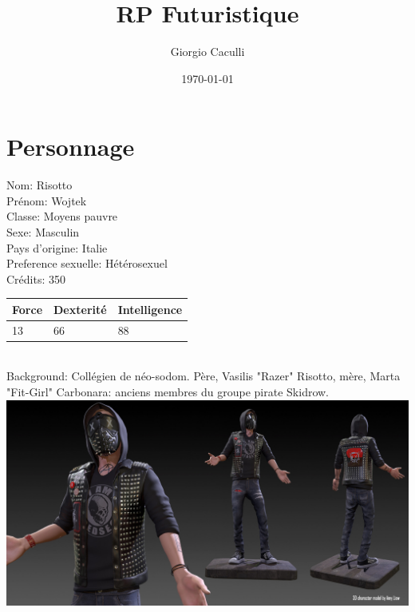 \documentclass[12pt]{article}
\title{RP Futuristique}
\author{Giorgio Caculli}
\date{\today}
\begin{document}
	\maketitle
	
	\newpage
	\tableofcontents
	
	\newpage
	\section{Personnage}
	
	Nom: Risotto\\
	
	Prénom: Wojtek\\
	
	Classe: Moyens pauvre\\
	
	Sexe: Masculin\\
	
	Pays d'origine: Italie\\
	
	Preference sexuelle: Hétérosexuel\\
	
	Crédits: 350\\
	
	\begin{tabularx}{\textwidth}{|X|X|X|}
		\hline
		Force & Dexterité & Intelligence\\
		\hline
		13 & 66 & 88\\
		\hline
	\end{tabularx}\\

	Background: Collégien de néo-sodom. Père, Vasilis "Razer" Risotto, mère, Marta "Fit-Girl" Carbonara: anciens membres du groupe pirate Skidrow.\\
	
	\includegraphics[width=\textwidth]{wrench}
\end{document}
